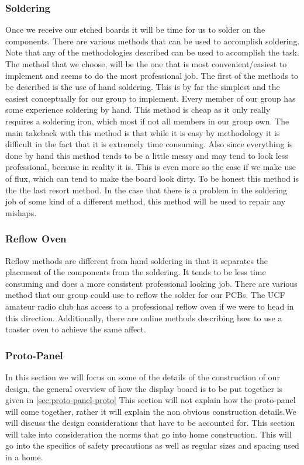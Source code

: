 \subsubsection{Soldering}
Once we receive our etched boards it will be time for us to solder on the
components. There are various methods that can be used to accomplish soldering.
Note that any of the methodologies described can be used to accomplish the
task. The method that we choose, will be the one that is most
convenient/easiest to implement and seems to do the most professional job. The
first of the methods to be described is the use of hand soldering. This is by
far the simplest and the easiest conceptually for our group to implement. Every
member of our group has some experience soldering by hand. This method is cheap
as it only really requires a soldering iron, which most if not all members in
our group own.  The main takeback with this method is that while it is easy by
methodology it is difficult in the fact that it is extremely time consuming.
Also since everything is done by hand this method tends to be a little messy
and may tend to look less professional, because in reality it is. This is even
more so the case if we make use of flux, which can tend to make the board look
dirty. To be honest this method is the the last resort method. In the case that
there is a problem in the soldering job of some kind of a different method,
this method will be used to repair any mishaps.

\subsubsection{Reflow Oven}
Reflow methods are different from hand soldering in that it separates the
placement of the components from the soldering. It tends to be less time
consuming and does a more consistent professional looking job. There are
various method that our group could use to reflow the solder for our PCBs. The
UCF amateur radio club has access to a professional reflow oven if we were to
head in this direction. Additionally, there are online methods describing how
to use a toaster oven to achieve the same affect.

\subsubsection{Proto-Panel}
\label{sec:proto-panel}
In this section we will focus on some of the details of the construction of our
design, the general overview of how the display board is to be put together is
given in \autoref{sec:proto-panel-proto} This section will not explain how the
proto{}-panel will come together, rather it will explain the non obvious
construction details.We will discuss the design considerations that have to be
accounted for. This section will take into consideration the norms that go into
home construction. This will go into the specifics of safety precautions as
well as regular sizes and spacing used in a home.

